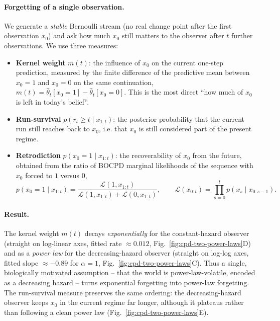 \paragraph{Forgetting of a single observation.}
We generate a \emph{stable} Bernoulli stream (no real change point after
the first observation $x_0$) and ask how much $x_0$ still matters to the
observer after $t$ further observations. We use three measures:
\begin{itemize}
    \item \textbf{Kernel weight} $m(t)$: the influence of $x_0$ on the
    current one-step prediction, measured by the finite difference of
    the predictive mean between $x_0{=}1$ and $x_0{=}0$ on the same
    continuation, $m(t) = \hat\theta_t[x_0{=}1] - \hat\theta_t[x_0{=}0]$.
    This is the most direct ``how much of $x_0$ is left in today's
    belief''.
    \item \textbf{Run-survival} $p(r_t \ge t \mid x_{1:t})$: the
    posterior probability that the current run still reaches back to
    $x_0$, i.e. that $x_0$ is still considered part of the present
    regime.
    \item \textbf{Retrodiction} $p(x_0{=}1 \mid x_{1:t})$: the
    recoverability of $x_0$ from the future, obtained from the ratio of
    BOCPD marginal likelihoods of the sequence with $x_0$ forced to $1$
    versus $0$,
    \begin{equation}
        p(x_0{=}1 \mid x_{1:t})
        = \frac{\mathcal L(1, x_{1:t})}{\mathcal L(1,x_{1:t}) + \mathcal L(0,x_{1:t})},
        \qquad
        \mathcal L(x_{0:t}) = \prod_{s=0}^{t} p(x_s \mid x_{0:s-1}).
    \end{equation}
\end{itemize}

\paragraph{Result.}
The kernel weight $m(t)$ decays \emph{exponentially} for the
constant-hazard observer (straight on log-linear axes, fitted rate
$\approx 0.012$, Fig.~\ref{fig:cpd-two-power-laws}D) and as a
\emph{power law} for the decreasing-hazard observer (straight on log-log
axes, fitted slope $\approx -0.89$ for $\alpha = 1$,
Fig.~\ref{fig:cpd-two-power-laws}C). Thus a single, biologically
motivated assumption -- that the world is power-law-volatile, encoded as
a decreasing hazard -- turns exponential forgetting into power-law
forgetting. The run-survival measure preserves the same ordering: the
decreasing-hazard observer keeps $x_0$ in the current regime far longer,
although it plateaus rather than following a clean power law
(Fig.~\ref{fig:cpd-two-power-laws}E).

